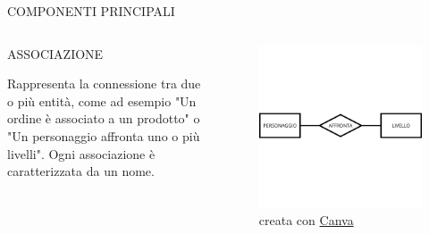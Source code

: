 \documentclass[aspectratio=1610]{beamer}
\begin{document}
\begin{frame}{COMPONENTI PRINCIPALI}
    \begin{columns}
            \begin{alertblock}{ASSOCIAZIONE}
                \begin{minipage}{0.96\linewidth}
                    \justifying
                    Rappresenta la connessione tra due o più entità, come ad 
                    esempio "Un ordine è associato a un prodotto" o "Un personaggio 
                    affronta uno o più livelli". Ogni associazione è caratterizzata da un nome.\\
                    \bigskip
                \end{minipage}
            \end{alertblock}
            \begin{figure}
                \includegraphics[width=\linewidth]{img/associazione.png}
                \caption{{creata con \href{www.canva.com}{Canva}}}
            \end{figure}
    \end{columns}
\end{frame}
\end{document}
